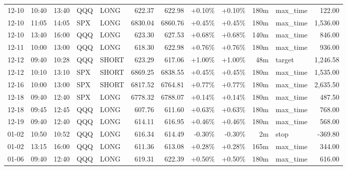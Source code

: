 \documentclass[11pt,a4paper,twoside]{article}
\begin{document}
\begin{center}
\begin{longtable}{>{\color{txtmain}}l l l l l r r r r r >{\color{txtmain}}l r}
12-10 & 10:40 & 13:40 & QQQ & LONG & 622.37 & 622.98 & \textcolor{wingreen}{+0.10\%} & \textcolor{wingreen}{+0.10\%} & 180m & max\_time & \textcolor{wingreen}{122.00} \\
12-10 & 11:05 & 14:05 & SPX & LONG & 6830.04 & 6860.76 & \textcolor{wingreen}{+0.45\%} & \textcolor{wingreen}{+0.45\%} & 180m & max\_time & \textcolor{wingreen}{1,536.00} \\
12-10 & 13:40 & 16:00 & QQQ & LONG & 623.30 & 627.53 & \textcolor{wingreen}{+0.68\%} & \textcolor{wingreen}{+0.68\%} & 140m & max\_time & \textcolor{wingreen}{846.00} \\
12-11 & 10:00 & 13:00 & QQQ & LONG & 618.30 & 622.98 & \textcolor{wingreen}{+0.76\%} & \textcolor{wingreen}{+0.76\%} & 180m & max\_time & \textcolor{wingreen}{936.00} \\
12-12 & 09:40 & 10:28 & QQQ & SHORT & 623.29 & 617.06 & \textcolor{wingreen}{+1.00\%} & \textcolor{wingreen}{+1.00\%} & 48m & target & \textcolor{wingreen}{1,246.58} \\
12-12 & 10:10 & 13:10 & SPX & SHORT & 6869.25 & 6838.55 & \textcolor{wingreen}{+0.45\%} & \textcolor{wingreen}{+0.45\%} & 180m & max\_time & \textcolor{wingreen}{1,535.00} \\
12-16 & 10:00 & 13:00 & SPX & SHORT & 6817.52 & 6764.81 & \textcolor{wingreen}{+0.77\%} & \textcolor{wingreen}{+0.77\%} & 180m & max\_time & \textcolor{wingreen}{2,635.50} \\
12-18 & 09:40 & 12:40 & SPX & LONG & 6778.32 & 6788.07 & \textcolor{wingreen}{+0.14\%} & \textcolor{wingreen}{+0.14\%} & 180m & max\_time & \textcolor{wingreen}{487.50} \\
12-18 & 09:45 & 12:45 & QQQ & LONG & 607.76 & 611.60 & \textcolor{wingreen}{+0.63\%} & \textcolor{wingreen}{+0.63\%} & 180m & max\_time & \textcolor{wingreen}{768.00} \\
12-19 & 09:40 & 12:40 & QQQ & LONG & 614.11 & 616.95 & \textcolor{wingreen}{+0.46\%} & \textcolor{wingreen}{+0.46\%} & 180m & max\_time & \textcolor{wingreen}{568.00} \\
01-02 & 10:50 & 10:52 & QQQ & LONG & 616.34 & 614.49 & \textcolor{lossred}{-0.30\%} & \textcolor{lossred}{-0.30\%} & 2m & stop & \textcolor{lossred}{-369.80} \\
01-02 & 13:15 & 16:00 & QQQ & LONG & 611.36 & 613.08 & \textcolor{wingreen}{+0.28\%} & \textcolor{wingreen}{+0.28\%} & 165m & max\_time & \textcolor{wingreen}{344.00} \\
01-06 & 09:40 & 12:40 & QQQ & LONG & 619.31 & 622.39 & \textcolor{wingreen}{+0.50\%} & \textcolor{wingreen}{+0.50\%} & 180m & max\_time & \textcolor{wingreen}{616.00} \\

\end{longtable}
\end{center}
\end{document}
